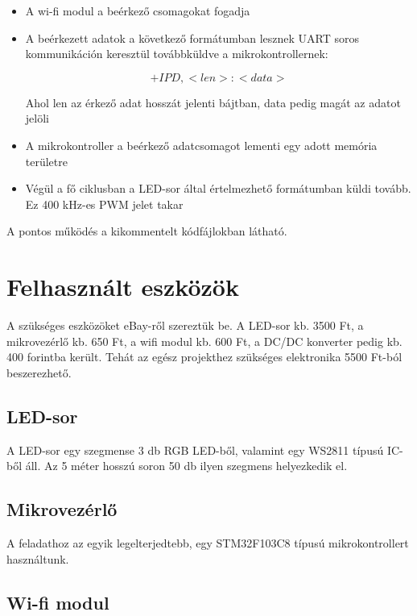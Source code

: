 \documentclass[12pt]{extarticle}
\begin{document}
\begin{itemize}
		\item A wi-fi modul a beérkező csomagokat fogadja
		
		\item A beérkezett adatok a következő formátumban lesznek UART soros kommunikáción keresztül továbbküldve a mikrokontrollernek:
		
		\begin{equation*}
			+IPD,<len>:<data>
		\end{equation*}
		
		Ahol len az érkező adat hosszát jelenti bájtban, data pedig magát az adatot jelöli
		
		\item A mikrokontroller a beérkező adatcsomagot lementi egy adott memória területre

		\item Végül a fő ciklusban a LED-sor által értelmezhető formátumban küldi tovább. Ez 400 kHz-es PWM jelet takar
	
		
	\end{itemize}
	
	
	A pontos működés a kikommentelt kódfájlokban látható.
	
		
	
	\section{Felhasznált eszközök}
	
	A szükséges eszközöket eBay-ről szereztük be. A LED-sor kb. 3500 Ft, a mikrovezérlő kb. 650 Ft, a wifi modul kb. 600 Ft, a DC/DC konverter pedig kb. 400 forintba került. Tehát az egész projekthez szükséges elektronika 5500 Ft-ból beszerezhető.
	
	\subsection{LED-sor}
	
	A LED-sor egy szegmense 3 db RGB LED-ből, valamint egy  WS2811 típusú IC-ből áll. Az 5 méter hosszú soron 50 db ilyen szegmens helyezkedik el.  
	
	\subsection{Mikrovezérlő}
	
	A feladathoz az egyik legelterjedtebb, egy STM32F103C8 típusú mikrokontrollert használtunk. 
	
	\subsection{Wi-fi modul}
	
\end{document}
